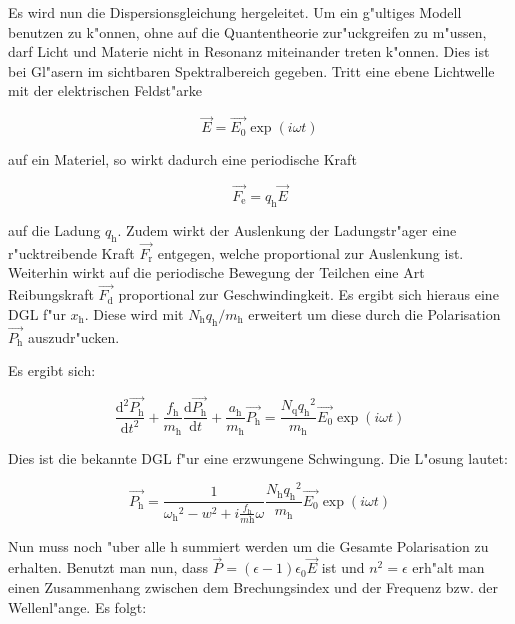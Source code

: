 	Es wird nun die Dispersionsgleichung hergeleitet.
	Um ein g"ultiges Modell benutzen zu k"onnen, ohne auf die Quantentheorie zur"uckgreifen zu m"ussen, darf Licht und Materie nicht in Resonanz miteinander treten k"onnen.
	Dies ist bei Gl"asern im sichtbaren Spektralbereich gegeben.
	Tritt eine ebene Lichtwelle mit der elektrischen Feldst"arke 

	\begin{equation}
		\vec{E} = \vec{E_\mathrm{0}} \exp{(i \omega t)}
	\end{equation}

	auf ein Materiel, so wirkt dadurch eine periodische Kraft

	\begin{equation}
		\vec{F_\mathrm{e}} = q_\mathrm{h} \vec{E}
	\end{equation}

	auf die Ladung $q_\mathrm{h}$.
	Zudem wirkt der Auslenkung der Ladungstr"ager eine r"ucktreibende Kraft $\vec{F_\mathrm{r}}$ entgegen, welche proportional zur Auslenkung ist. Weiterhin wirkt auf die periodische Bewegung der Teilchen eine Art Reibungskraft $\vec{F_\mathrm{d}}$ proportional zur Geschwindingkeit.
	Es ergibt sich hieraus eine DGL f"ur $x_\mathrm{h}$. Diese wird mit $N_\mathrm{h} q_\mathrm{h} / m_\mathrm{h}$ erweitert um diese durch die Polarisation $\vec{P_\mathrm{h}}$ auszudr"ucken. 

	Es ergibt sich:

	\begin{equation}
		\frac{\mathrm{d}^2 \vec{P_\mathrm{h}}}{\mathrm{d} t^2} + \frac{f_\mathrm{h}}{m_\mathrm{h}} \frac{\mathrm{d} \vec{P_\mathrm{h}}}{\mathrm{d} t} + \frac{a_\mathrm{h}}{m_\mathrm{h}} \vec{P_\mathrm{h}} = \frac{N_\mathrm{q} {q_\mathrm{h}}^2}{m_\mathrm{h}} \vec{E_\mathrm{0}} \exp{(i \omega t)} 
	\end{equation}

	Dies ist die bekannte DGL f"ur eine erzwungene Schwingung. Die L"osung lautet:

	\begin{equation}
		\vec{P_\mathrm{h}} = \frac{1}{{\omega_\mathrm{h}}^2 - w^2 + i \frac{f_\mathrm{h}}{m\mathrm{h}} \omega} \frac{N_\mathrm{h} {q_\mathrm{h}}^2}{m_\mathrm{h}} \vec{E_\mathrm{0}} \exp{(i \omega t)} 
	\end{equation}

	Nun muss noch "uber alle h summiert werden um die Gesamte Polarisation zu erhalten. Benutzt man nun, dass $\vec{P} = (\epsilon - 1) \epsilon_\mathrm{0} \vec{E}$  ist und $n^2 = \epsilon$ erh"alt man einen Zusammenhang zwischen dem Brechungsindex und der Frequenz bzw. der Wellenl"ange.
	Es folgt:

